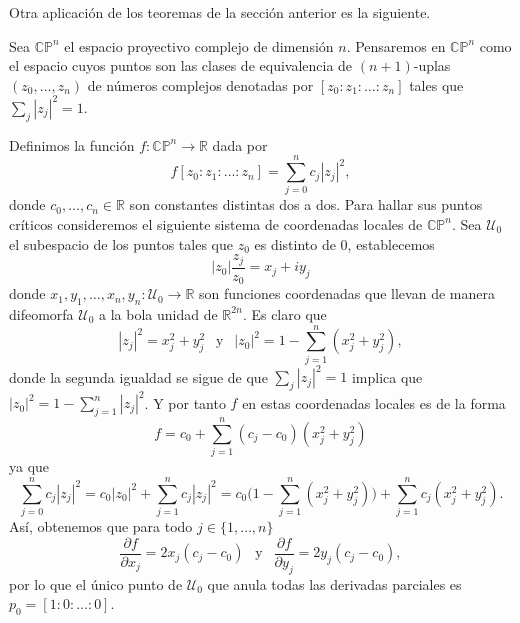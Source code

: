 \vspace{2.5em}

Otra aplicación de los teoremas de la sección anterior es la siguiente.

Sea $\mathbb{CP}^n$ el espacio proyectivo complejo de dimensión $n$. Pensaremos en $\mathbb{CP}^n$ como el espacio cuyos puntos son las clases de equivalencia de $(n+1)$-uplas $(z_0,\dots,z_n)$ de números complejos denotadas por $[z_0:z_1:\dots:z_n]$ tales que $\sum_j |z_j|^2=1$. 

Definimos la función $f:\mathbb{CP}^n \to \mathbb{R}$ dada por 
\begin{equation*}
    f[z_0:z_1:\dots:z_n] = \sum_{j=0}^n c_j |z_j|^2,
\end{equation*}
donde $c_0,\dots,c_n\in \mathbb{R}$ son constantes distintas dos a dos. Para hallar sus puntos críticos consideremos el siguiente sistema de coordenadas locales de $\mathbb{CP}^n$. Sea $\mathcal{U}_0$ el subespacio de los puntos tales que $z_0$ es distinto de $0$, establecemos 
\begin{equation*}
    |z_0|\frac{z_j}{z_0} = x_j + iy_j
\end{equation*}
donde $x_1,y_1,\dots,x_n,y_n : \mathcal{U}_0\to \mathbb{R}$ son funciones coordenadas que llevan de manera difeomorfa $\mathcal{U}_0$ a la bola unidad de $\mathbb{R}^{2n}$. Es claro que 
\begin{equation*}
    |z_j|^2 = x_j^2 + y_j^2 ~~\text{ y }~~ |z_0|^2 = 1 - \sum_{j=1}^n (x_j^2 + y_j^2),
\end{equation*}
donde la segunda igualdad se sigue de que $\sum_j |z_j|^2=1$ implica que $|z_0|^2 = 1 - \sum_{j=1}^n |z_j|^2 $. Y por tanto $f$ en estas coordenadas locales es de la forma
\begin{equation*}
    f = c_0 + \sum_{j=1}^n (c_j-c_0)(x_j^2 + y_j^2)
\end{equation*}
ya que 
\begin{equation*}
    \sum_{j=0}^n c_j |z_j|^2 = c_0|z_0|^2 + \sum_{j=1}^n c_j |z_j|^2 = c_0 \Big(1 - \sum_{j=1}^n (x_j^2 + y_j^2) \Big) + \sum_{j=1}^n c_j(x_j^2 + y_j^2).
\end{equation*}
Así, obtenemos que para todo $j\in\{1,\dots,n\}$
\begin{equation*}
    \frac{\partial f}{\partial x_j} = 2x_j(c_j - c_0) ~~\text{ y }~~ \frac{\partial f}{\partial y_j} = 2y_j(c_j - c_0),
\end{equation*}
por lo que el único punto de $\mathcal{U}_0$ que anula todas las derivadas parciales es $p_0 = [1:0:\dots:0]$. 

